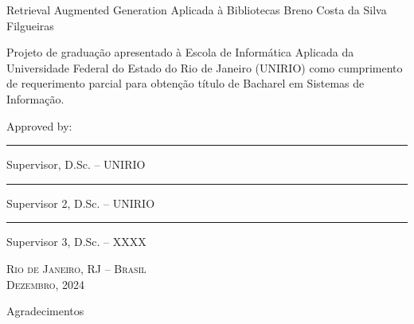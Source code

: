\documentclass[a4paper, 12pt]{article}
\begin{document}
    \begin{center}
        Retrieval Augmented Generation Aplicada à Bibliotecas
        \vskip 0.5cm
        Breno Costa da Silva Filgueiras
        \vskip 2.0cm
    \end{center}
    \begin{flushright}
        \parbox{8.0cm}{
        Projeto de graduação apresentado à Escola de Informática Aplicada
        da Universidade Federal do Estado do Rio de Janeiro (UNIRIO) como
        cumprimento de requerimento parcial para obtenção título de Bacharel em
        Sistemas de Informação.}
        \vskip 1.5cm
        Approved by:
        \vskip 1.5cm
        \rule{10.0cm}{.1mm}

        Supervisor, D.Sc. -- UNIRIO
        \vskip 1.0cm

        \rule{10.0cm}{.1mm}

        Supervisor 2, D.Sc. -- UNIRIO
        \vskip 1.0cm

        \rule{10.0cm}{.1mm}

        Supervisor 3, D.Sc. -- XXXX
        \vskip 1.0cm
    \end{flushright}
    \begin{center}
        \textsc{Rio de Janeiro, RJ -- Brasil} \\ \textsc{Dezembro, 2024}
    \end{center}

    \clearpage
    \begin{flushright}
        Agradecimentos
    \end{flushright}
    \lipsum[1-2]
    \clearpage
\end{document}
